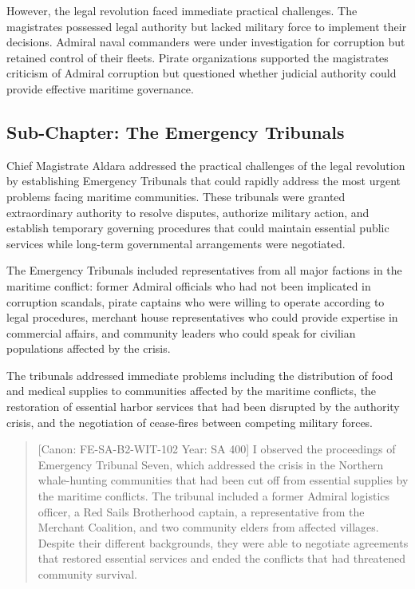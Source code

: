 However, the legal revolution faced immediate practical challenges. The
magistrates possessed legal authority but lacked military force to
implement their decisions. Admiral naval commanders were under
investigation for corruption but retained control of their fleets.
Pirate organizations supported the magistrates\textquotesingle{}
criticism of Admiral corruption but questioned whether judicial
authority could provide effective maritime governance.

\subsection{Sub-Chapter: The Emergency
Tribunals}\label{sub-chapter-the-emergency-tribunals}

Chief Magistrate Aldara addressed the practical challenges of the legal
revolution by establishing Emergency Tribunals that could rapidly
address the most urgent problems facing maritime communities. These
tribunals were granted extraordinary authority to resolve disputes,
authorize military action, and establish temporary governing procedures
that could maintain essential public services while long-term
governmental arrangements were negotiated.

The Emergency Tribunals included representatives from all major factions
in the maritime conflict: former Admiral officials who had not been
implicated in corruption scandals, pirate captains who were willing to
operate according to legal procedures, merchant house representatives
who could provide expertise in commercial affairs, and community leaders
who could speak for civilian populations affected by the crisis.

The tribunals addressed immediate problems including the distribution of
food and medical supplies to communities affected by the maritime
conflicts, the restoration of essential harbor services that had been
disrupted by the authority crisis, and the negotiation of cease-fires
between competing military forces.

\begin{quote}
{[}Canon: FE-SA-B2-WIT-102 \textbar{} Year: SA 400{]} I observed the
proceedings of Emergency Tribunal Seven, which addressed the crisis in
the Northern whale-hunting communities that had been cut off from
essential supplies by the maritime conflicts. The tribunal included a
former Admiral logistics officer, a Red Sails Brotherhood captain, a
representative from the Merchant Coalition, and two community elders
from affected villages. Despite their different backgrounds, they were
able to negotiate agreements that restored essential services and ended
the conflicts that had threatened community survival.
\end{quote}

